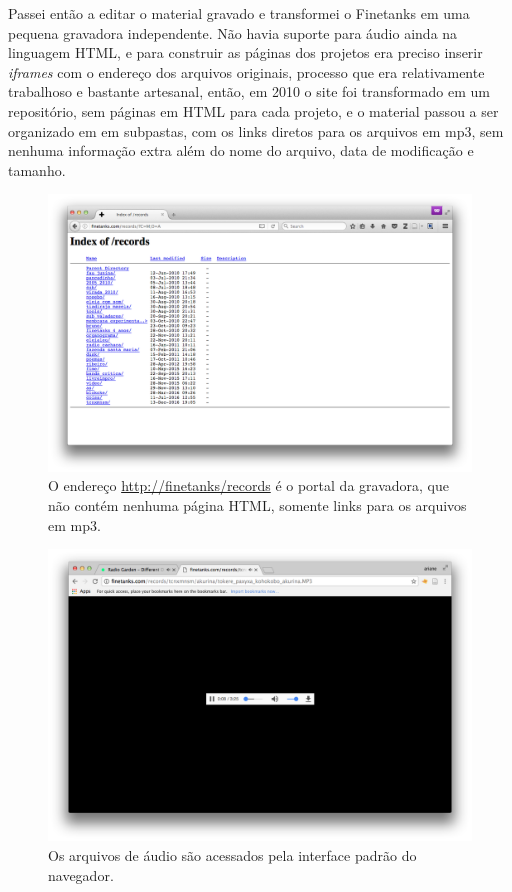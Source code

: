 Passei então a editar o material gravado e transformei o Finetanks em uma pequena gravadora independente. Não havia suporte para áudio ainda na linguagem HTML, e para construir as páginas dos projetos era preciso inserir \emph{iframes} com o endereço dos arquivos originais, processo que era relativamente trabalhoso e bastante artesanal, então, em 2010 o site foi transformado em um repositório, sem páginas em HTML para cada projeto, e o material passou a ser organizado em em subpastas, com os links diretos para os arquivos em mp3, sem nenhuma informação extra além do nome do arquivo, data de modificação e tamanho. 


\begin{figure}

\includegraphics[width=1\textwidth]{pictures/cap1/finetanksrecords}
\caption{O endereço \url{http://finetanks/records} é o portal da gravadora, que não contém nenhuma página HTML, somente links para os arquivos em mp3.}
\label{fig:finetanksrecords}
\end{figure}


\begin{figure}

\includegraphics[width=1\textwidth]{pictures/cap1/finetanksmp3}
\caption{Os arquivos de áudio são acessados pela interface padrão do navegador.}
\label{fig:finetanksmp3}
\end{figure}

